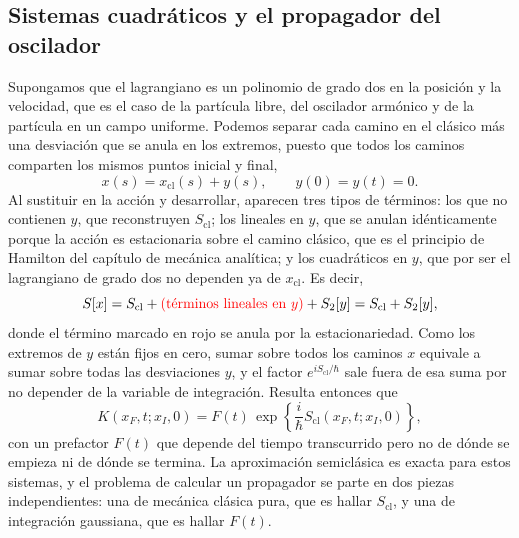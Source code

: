     \subsection{Sistemas cuadráticos y el propagador del oscilador}

        Supongamos que el lagrangiano es un polinomio de grado dos en la posición y la velocidad, que es el caso de la partícula libre, del oscilador armónico y de la partícula en un campo uniforme. Podemos separar cada camino en el clásico más una desviación que se anula en los extremos, puesto que todos los caminos comparten los mismos puntos inicial y final,
        \begin{equation}\label{eq:SeparacionCamino}
            x(s) = x_{\mathrm{cl}}(s) + y(s),
            \qquad y(0)=y(t)=0 .
        \end{equation}
        Al sustituir en la acción y desarrollar, aparecen tres tipos de términos: los que no contienen $y$, que reconstruyen $S_{\mathrm{cl}}$; los lineales en $y$, que se anulan idénticamente porque la acción es estacionaria sobre el camino clásico, que es el principio de Hamilton del capítulo de mecánica analítica; y los cuadráticos en $y$, que por ser el lagrangiano de grado dos no dependen ya de $x_{\mathrm{cl}}$. Es decir,
        \begin{equation}\label{eq:AccionSeparadaFey}
            S[x] = S_{\mathrm{cl}} + \textcolor{red}{\left(\text{términos lineales en } y\right)} + S_{2}[y] = S_{\mathrm{cl}} + S_{2}[y],
        \end{equation}
        donde el término marcado en rojo se anula por la estacionariedad. Como los extremos de $y$ están fijos en cero, sumar sobre todos los caminos $x$ equivale a sumar sobre todas las desviaciones $y$, y el factor $e^{iS_{\mathrm{cl}}/\hbar}$ sale fuera de esa suma por no depender de la variable de integración. Resulta entonces que
        \begin{equation}\label{eq:FormaCuadratica}
            K(x_{F},t;x_{I},0) = F(t)\,\exp\left\{\frac{i}{\hbar}S_{\mathrm{cl}}(x_{F},t;x_{I},0)\right\},
        \end{equation}
        con un prefactor $F(t)$ que depende del tiempo transcurrido pero no de dónde se empieza ni de dónde se termina. La aproximación semiclásica es exacta para estos sistemas, y el problema de calcular un propagador se parte en dos piezas independientes: una de mecánica clásica pura, que es hallar $S_{\mathrm{cl}}$, y una de integración gaussiana, que es hallar $F(t)$.

